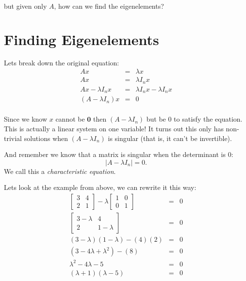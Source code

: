 but given only $A$, how can we find the eigenelements? 

\section{Finding Eigenelements}
Lets break down the original equation: 
\[\begin{array}{rcl}
Ax&=&\lambda x\\
Ax&=&\lambda I_n x\\
Ax-\lambda I_n x&=&\lambda I_n x-\lambda I_n x\\
(A-\lambda I_n)x & = & 0\\
\end{array}\]

Since we know $x$ cannot be $\mathbf{0}$ then $(A-\lambda I_n)$ but be 0 to satisfy the equation. 
This is actually a linear system on one variable!
It turns out this only has non-trivial solutions when $(A-\lambda I_n)$ is singular (that is, it can't be invertible). 

And remember we know that a matrix is singular when the determinant is $0$: 
 \[|A-\lambda I_n|=0.\]
We call this a \emph{characteristic equation}. 

Lets look at the example from above, 
we can rewrite it this way: 
\[\begin{array}{rcl}
\begin{bmatrix}3 & 4 \\ 2 & 1\end{bmatrix}-\lambda\begin{bmatrix}1&0\\0&1\end{bmatrix} & = & 0\\
\begin{bmatrix}3-\lambda & 4 \\ 2 & 1-\lambda\end{bmatrix} & = & 0\\
(3-\lambda)(1-\lambda)-(4)(2) & = & 0\\
(3-4\lambda+\lambda^2)-(8) & = & 0\\
\lambda^2-4\lambda-5 & = & 0\\
(\lambda+1)(\lambda - 5)  & = & 0\\
\end{array}\]

